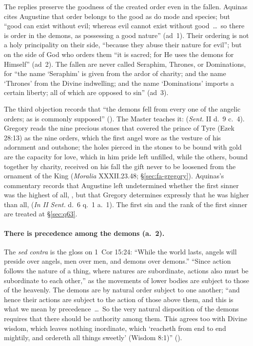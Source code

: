 The replies preserve the goodness of the created order even in the fallen.
Aquinas cites Augustine that order belongs to the good as do mode and
species; but ``good can exist without evil; whereas evil cannot exist without
good~\dots\ so there is order in the demons, as possessing a good nature''
(ad~1).
Their ordering is not a holy principality on their side, ``because they abuse
their nature for evil''; but on the side of God who orders them ``it is
sacred; for He uses the demons for Himself'' (ad~2). The fallen are never
called Seraphim, Thrones, or Dominations, for ``the name `Seraphim' is given
from the ardor of charity; and the name `Thrones' from the Divine indwelling;
and the name `Dominations' imports a certain liberty; all of which are
opposed to sin'' (ad~3).

The third objection records that ``the demons fell from every one of the
angelic orders; as is commonly supposed'' ().
The Master teaches it:  (\emph{Sent.} II
d.~9 c.~4). Gregory reads the nine precious stones that covered the prince of Tyre
(Ezek 28:13) as the nine orders, which the first angel wore as the vesture
of his adornment and outshone; the holes pierced in the stones to be bound
with gold are the capacity for love, which in him pride left unfilled, while
the others, bound together by charity, received on his fall the gift never
to be loosened from the ornament of the King (\emph{Moralia} XXXII.23.48;
\S\ref{sec:fa-gregory}).
Aquinas's commentary records that Augustine left undetermined whether the
first sinner was the highest of all, , but that Gregory determines
expressly that he was higher than all,  (\emph{In II Sent.} d.~6 q.~1 a.~1). The first sin and the rank
of the first sinner are treated at \S\ref{sec:q63}.

\paragraph{There is precedence among the demons (a.~2).} The \emph{sed
contra} is the gloss on 1~Cor 15:24: ``While the world lasts, angels will
preside over angels, men over men, and demons over demons.'' ``Since action
follows the nature of a thing, where natures are subordinate, actions also
must be subordinate to each other,'' as the movements of lower bodies are
subject to those of the heavenly. The demons are by natural order subject
to one another; ``and hence their actions are subject to the action of those
above them, and this is what we mean by precedence~\dots\ So the very natural
disposition of the demons requires that there should be authority among
them. This agrees too with Divine wisdom, which leaves nothing inordinate,
which `reacheth from end to end mightily, and ordereth all things sweetly'
(Wisdom 8:1)'' ().

